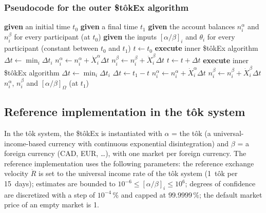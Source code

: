 \documentclass[letterpaper]{article}
\newcommand{\priceAB}{\left[\alpha / \beta\right]}
\newcommand{\StokEx}{\$t\^{o}kEx}
\begin{document}
\subsubsection{Pseudocode for the outer \StokEx{} algorithm}

\begin{algorithmic}[1]
    \STATE \textbf{given} an initial time $t_0$
    \STATE \textbf{given} a final time $t_1$
    \STATE \textbf{given} the account balances $n_i^\alpha$ and $n_i^\beta$ for every participant (at $t_0$)
    \STATE \textbf{given} the inputs $\priceAB_i$ and $\theta_i$ for every participant (constant between $t_0$ and $t_1$)
    \STATE $t \gets t_0$
    \STATE \textbf{execute} inner \StokEx{} algorithm
    \STATE $\Delta t \gets \min_i \Delta t_i$
            \STATE $n_i^\alpha \gets n_i^\alpha + \dot{X}_i^\alpha \Delta t$
            \STATE $n_i^\beta \gets n_i^\beta + \dot{X}_i^\beta \Delta t$
        \ENDFOR
        \STATE $t \gets t + \Delta t$
        \STATE \textbf{execute} inner \StokEx{} algorithm
        \STATE $\Delta t \gets \min_i \Delta t_i$
    \ENDWHILE
    \STATE $\Delta t \gets t_1 - t$
        \STATE $n_i^\alpha \gets n_i^\alpha + \dot{X}_i^\alpha \Delta t$
        \STATE $n_i^\beta \gets n_i^\beta + \dot{X}_i^\beta \Delta t$
    \ENDFOR
    \RETURN $n_i^\alpha$, $n_i^\beta$ and $\priceAB_\Omega$ (at $t_1$)
\end{algorithmic}

\subsection{Reference implementation in the t\^{o}k system}\label{secReferenceImplementation}

In the t\^{o}k system, the \StokEx{} is instantiated with $\alpha$ = the t\^{o}k (a universal-income-based currency with continuous exponential disintegration) and $\beta$ = a foreign currency (CAD, EUR, \ldots), with one market per foreign currency. The reference implementation uses the following parameters: the reference exchange velocity $\dot{R}$ is set to the universal income rate of the t\^{o}k system (1~t\^{o}k per 15~days); estimates are bounded to $10^{-6} \leq \priceAB_i \leq 10^{6}$; degrees of confidence are discretized with a step of $10^{-4}\,\%$ and capped at $99.9999\,\%$; the default market price of an empty market is 1.
\end{document}
